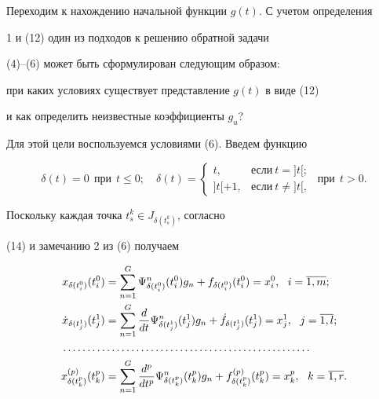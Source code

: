 Переходим к нахождению начальной функции $g(t)$. С учетом определения


1 и (12) один из подходов к решению обратной задачи


(4)--(6) может быть сформулирован следующим образом:


при каких условиях существует представление $g(t)$ в виде (12)


и как определить неизвестные коэффициенты $g_u$?





Для этой цели воспользуемся условиями (6). Введем функцию


$$


\delta(t)=0\ \  \text{при}\ \ t\leq 0;\quad


\delta(t)=


\begin{cases}


t, & \text{если}\ t=]t[;\\


]t[+1, & \text{если}\ t\neq ]t[,


\end{cases}


\ \ 


\text{при}\ \ t>0.


$$





Поскольку каждая точка $t_s^k\in J_{\delta(t_s^k)}$, согласно


(14) и замечанию 2 из (6) получаем


\begin{align}


x_{\delta(t_i^0)}(t_i^0)


&=\sum_{n=1}^G \Psi_{\delta(t_i^0)}^n(t_i^0)g_n


+f_{\delta(t_i^0)}(t_i^0)=x_i^0,\ \ i=\overline{1,m};\notag \\


%


\Dot{x}_{\delta(t_j^1)}(t_j^1)&=\sum_{n=1}^G \frac{d}{dt}


\Psi_{\delta(t_j^1)}^n(t_j^1)g_n+\Dot{f}_{\delta(t_j^1)}(t_j^1)=


x_j^1,\ \ j=\overline{1,l};\notag \\


%


\dotsc\dotsc\dotsc&\dotsc\dotsc\dotsc\dotsc\dotsc\dotsc\dotsc\dotsc\dotsc\dotsc


\dotsc\dotsc\dotsc\dotsc\notag \\


%


x_{\delta(t_k^p)}^{(p)}(t_k^p)&=\sum_{n=1}^G \frac{d^p}{dt^p}


\Psi_{\delta(t_k^p)}^n(t_k^p)g_n+f_{\delta(t_k^p)}^{(p)}(t_k^p)=


x_k^p,\ \ k=\overline{1,r}. 


\end{align}





